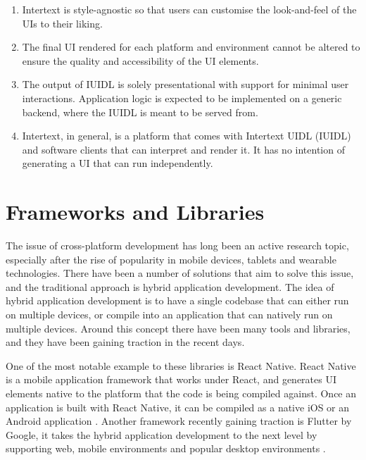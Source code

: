 \begin{enumerate}
  \item Intertext is style-agnostic so that users can customise the look-and-feel of the UIs to their liking.
  
  \item The final UI rendered for each platform and environment cannot be altered to ensure the quality and accessibility of the UI elements.
  
  \item The output of IUIDL is solely presentational with support for minimal user interactions. Application logic is expected to be implemented on a generic backend, where the IUIDL is meant to be served from.

  \item Intertext, in general, is a platform that comes with Intertext UIDL (IUIDL) and software clients that can interpret and render it. It has no intention of generating a UI that can run independently.
\end{enumerate}

\section{Frameworks and Libraries} \label{relatedTools}

The issue of cross-platform development has long been an active research topic, especially after the rise of popularity in mobile devices, tablets and wearable technologies. There have been a number of solutions that aim to solve this issue, and the traditional approach is hybrid application development. The idea of hybrid application development is to have a single codebase that can either run on multiple devices, or compile into an application that can natively run on multiple devices. Around this concept there have been many tools and libraries, and they have been gaining traction in the recent days.

One of the most notable example to these libraries is React Native. React Native is a mobile application framework that works under React, and generates UI elements native to the platform that the code is being compiled against. Once an application is built with React Native, it can be compiled as a native iOS or an Android application \cite{ReactNative}. Another framework recently gaining traction is Flutter by Google, it takes the hybrid application development to the next level by supporting web, mobile environments and popular desktop environments \cite{Flutter}.



